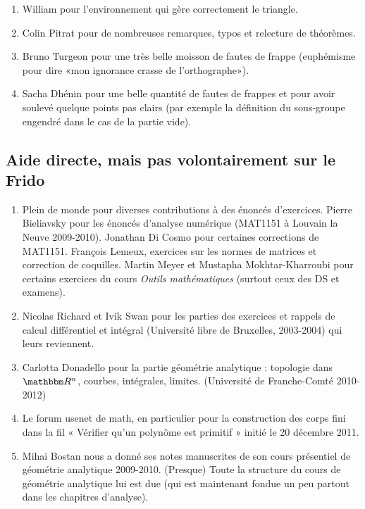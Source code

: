 \begin{enumerate}
    \item 
        William pour l'environnement  qui gère correctement le triangle.
    \item
        Colin Pitrat pour de nombreuses remarques, typos et relecture de théorèmes.
    \item
        Bruno Turgeon pour une très belle moisson de fautes de frappe (euphémisme pour dire «mon ignorance crasse de l'orthographe»).
    \item
        Sacha Dhénin pour une belle quantité de fautes de frappes et pour avoir soulevé quelque points pas clairs (par exemple la définition du sous-groupe engendré dans le cas de la partie vide).
\end{enumerate}

\subsection{Aide directe, mais pas volontairement sur le Frido}

\begin{enumerate}
    \item
        Plein de monde pour diverses contributions à des énoncés d'exercices. Pierre Bieliavsky pour les énoncés d'analyse numérique (MAT1151 à Louvain la Neuve 2009-2010). Jonathan Di Cosmo pour certaines corrections de MAT1151. François Lemeux, exercices sur les normes de matrices et correction de coquilles.  Martin Meyer et Mustapha Mokhtar-Kharroubi pour certains exercices du cours \emph{Outils mathématiques} (surtout ceux des DS et examens).
    \item
        Nicolas Richard et Ivik Swan pour les parties des exercices et rappels de calcul différentiel et intégral (Université libre de Bruxelles, 2003-2004) qui leurs reviennent.
    \item
	Carlotta Donadello pour la partie géométrie analytique : topologie dans \( \eR^n\), courbes, intégrales, limites. (Université de Franche-Comté 2010-2012)
    \item
        Le forum usenet de math, en particulier pour la construction des corps fini dans la fil « Vérifier qu'un polynôme est primitif » initié le 20 décembre 2011.
    \item
        Mihai Bostan nous a donné ses notes manuscrites de son cours présentiel de géométrie analytique 2009-2010. (Presque) Toute la structure du cours de géométrie analytique lui est due (qui est maintenant fondue un peu partout dans les chapitres d'analyse).
\end{enumerate}

